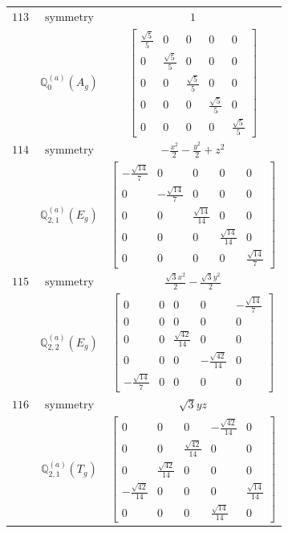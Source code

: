\documentclass[fleqn,8pt,landscape]{jsarticle}
\begin{document}
\begin{longtable}{ccc}
$ 113 $ & $ \text{symmetry} $ & $ 1 $ \\
$  $ & $ \mathbb{Q}_{0}^{(a)}(A_{g}) $ & $ \begin{bmatrix} \frac{\sqrt{5}}{5} & 0 & 0 & 0 & 0 \\ 0 & \frac{\sqrt{5}}{5} & 0 & 0 & 0 \\ 0 & 0 & \frac{\sqrt{5}}{5} & 0 & 0 \\ 0 & 0 & 0 & \frac{\sqrt{5}}{5} & 0 \\ 0 & 0 & 0 & 0 & \frac{\sqrt{5}}{5} \end{bmatrix} $ \\ \hline
$ 114 $ & $ \text{symmetry} $ & $ - \frac{x^{2}}{2} - \frac{y^{2}}{2} + z^{2} $ \\
$  $ & $ \mathbb{Q}_{2,1}^{(a)}(E_{g}) $ & $ \begin{bmatrix} - \frac{\sqrt{14}}{7} & 0 & 0 & 0 & 0 \\ 0 & - \frac{\sqrt{14}}{7} & 0 & 0 & 0 \\ 0 & 0 & \frac{\sqrt{14}}{14} & 0 & 0 \\ 0 & 0 & 0 & \frac{\sqrt{14}}{14} & 0 \\ 0 & 0 & 0 & 0 & \frac{\sqrt{14}}{7} \end{bmatrix} $ \\ \hline
$ 115 $ & $ \text{symmetry} $ & $ \frac{\sqrt{3} x^{2}}{2} - \frac{\sqrt{3} y^{2}}{2} $ \\
$  $ & $ \mathbb{Q}_{2,2}^{(a)}(E_{g}) $ & $ \begin{bmatrix} 0 & 0 & 0 & 0 & - \frac{\sqrt{14}}{7} \\ 0 & 0 & 0 & 0 & 0 \\ 0 & 0 & \frac{\sqrt{42}}{14} & 0 & 0 \\ 0 & 0 & 0 & - \frac{\sqrt{42}}{14} & 0 \\ - \frac{\sqrt{14}}{7} & 0 & 0 & 0 & 0 \end{bmatrix} $ \\ \hline
$ 116 $ & $ \text{symmetry} $ & $ \sqrt{3} y z $ \\
$  $ & $ \mathbb{Q}_{2,1}^{(a)}(T_{g}) $ & $ \begin{bmatrix} 0 & 0 & 0 & - \frac{\sqrt{42}}{14} & 0 \\ 0 & 0 & \frac{\sqrt{42}}{14} & 0 & 0 \\ 0 & \frac{\sqrt{42}}{14} & 0 & 0 & 0 \\ - \frac{\sqrt{42}}{14} & 0 & 0 & 0 & \frac{\sqrt{14}}{14} \\ 0 & 0 & 0 & \frac{\sqrt{14}}{14} & 0 \end{bmatrix} $ \\ \hline

\end{longtable}
\end{document}
